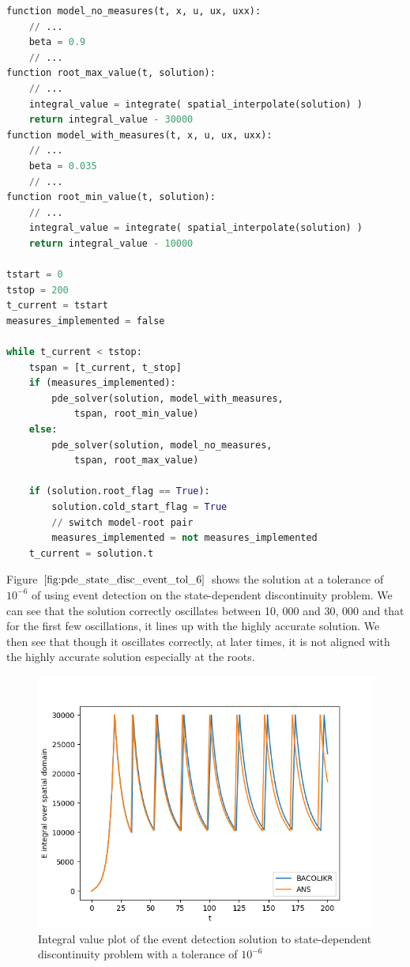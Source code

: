 \documentclass{article}
\begin{document}
\begin{minipage}{\linewidth}
\begin{lstlisting}[language=Python]
function model_no_measures(t, x, u, ux, uxx):
	// ...
	beta = 0.9
	// ...
function root_max_value(t, solution):
	// ...
	integral_value = integrate( spatial_interpolate(solution) )
	return integral_value - 30000
function model_with_measures(t, x, u, ux, uxx):
	// ...
	beta = 0.035
	// ...
function root_min_value(t, solution):
	// ...
	integral_value = integrate( spatial_interpolate(solution) )
	return integral_value - 10000

tstart = 0
tstop = 200
t_current = tstart
measures_implemented = false

while t_current < tstop:
	tspan = [t_current, t_stop]
	if (measures_implemented):
		pde_solver(solution, model_with_measures, 
			tspan, root_min_value)
	else:
		pde_solver(solution, model_no_measures, 
			tspan, root_max_value)
	
	if (solution.root_flag == True):
		solution.cold_start_flag = True
		// switch model-root pair
		measures_implemented = not measures_implemented
	t_current = solution.t

\end{lstlisting}
\end{minipage}

Figure $\ref{fig:pde_state_disc_event_tol_6}$ shows the solution at a tolerance of $10^{-6}$ of using event detection on the state-dependent discontinuity problem. We can see that the solution correctly oscillates between 10, 000 and 30, 000 and that for the first few oscillations, it lines up with the highly accurate solution. We then see that though it oscillates correctly, at later times, it is not aligned with the highly accurate solution especially at the roots. 

\begin{figure}[H]
\centering
\includegraphics[width=0.7\linewidth]{./figures/pde_state_disc_event_tol_6}
\caption{Integral value plot of the event detection solution to state-dependent discontinuity problem with a tolerance of $10^{-6}$}
\label{fig:pde_state_disc_event_tol_6}
\end{figure}
\end{document}
